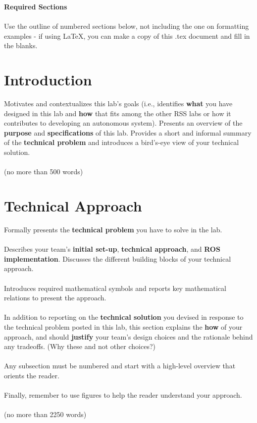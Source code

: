 \documentclass{article}
\begin{document}
\textbf{Required Sections}\\\\
Use the outline of numbered sections below, not including the one on formatting examples - if using LaTeX, you can make a copy of this .tex document and fill in the blanks.

\section{Introduction}
Motivates and contextualizes this lab’s goals (i.e., identifies \textbf{what} you have designed in this lab and \textbf{how} that fits among the other RSS labs or how it contributes to developing an autonomous system). Presents an overview of the \textbf{purpose} and \textbf{specifications} of this lab. Provides a short and informal summary of the \textbf{technical problem} and introduces a bird’s-eye view of your technical solution.\\\\
(no more than 500 words)

\section{Technical Approach}
Formally presents the \textbf{technical problem} you have to solve in the lab.\\\\
Describes your team’s \textbf{initial set-up}, \textbf{technical approach}, and \textbf{ROS implementation}. Discusses the different building blocks of your technical approach.\\\\
Introduces required mathematical symbols and reports key mathematical relations to present the approach.\\\\
In addition to reporting on the \textbf{technical solution} you devised in response to the technical problem posted in this lab, this section explains the \textbf{how} of your approach, and should \textbf{justify} your team’s design choices and the rationale behind any tradeoffs. (Why these and not other choices?)\\\\
Any subsection must be numbered and start with a high-level overview that orients the reader.\\\\
Finally, remember to use figures to help the reader understand your approach.\\\\
(no more than 2250 words)
\end{document}
